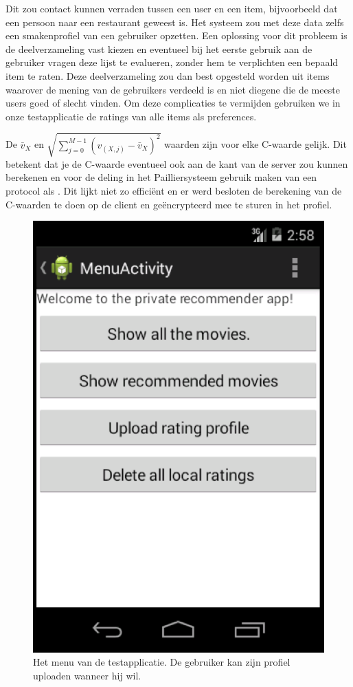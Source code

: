 Dit zou contact kunnen verraden tussen een user en een item, bijvoorbeeld dat een persoon naar een restaurant geweest is.
Het systeem zou met deze data zelfs een smakenprofiel van een gebruiker opzetten. Een oplossing voor dit probleem is de deelverzameling vast kiezen en eventueel bij het eerste gebruik aan de gebruiker vragen deze lijst te evalueren, zonder hem te verplichten een bepaald item te raten. Deze deelverzameling zou dan best opgesteld worden uit items waarover de mening van de gebruikers verdeeld is en niet diegene die de meeste users goed of slecht vinden. Om deze complicaties te vermijden gebruiken we in onze testapplicatie de ratings van alle items als preferences.

De  $\bar{v}_X$ en $\sqrt{\sum_{j=0}^{M-1} (v_{(X,j)} - \bar{v}_X)^2}$ waarden zijn voor elke C-waarde gelijk. Dit betekent dat je de C-waarde eventueel ook aan de kant van de server zou kunnen berekenen en voor de deling in het Pailliersysteem gebruik maken van een protocol als \cite{VeugenEID}. Dit lijkt niet zo effici\"ent en er werd besloten de berekening van de C-waarden te doen op de client en ge\"encrypteerd mee te sturen in het profiel.
\begin{figure}[htpb]   
    \label{Figuur::upload_profile}      
  \begin{center}    
 \includegraphics[scale=0.5]{fig/upload_profile}    
  \end{center}   
  \caption{Het menu van de testapplicatie. De gebruiker kan zijn profiel uploaden wanneer hij wil.}  
   \end{figure}
